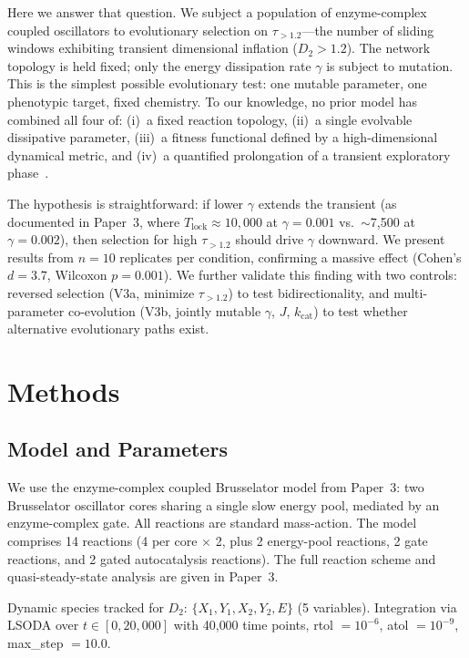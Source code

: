 \documentclass[twocolumn,showpacs,preprintnumbers,amsmath,amssymb,prd,floatfix]{revtex4-2}
\newcommand{\tauexp}{\tau_{>1.2}}
\newcommand{\Tlock}{T_{\mathrm{lock}}}
\newcommand{\Dtwo}{D_2}
\newcommand{\kcat}{k_{\mathrm{cat}}}
\begin{document}
Here we answer that question. We subject a population of enzyme-complex coupled oscillators to evolutionary selection on $\tauexp$---the number of sliding windows exhibiting transient dimensional inflation ($\Dtwo > 1.2$). The network topology is held fixed; only the energy dissipation rate $\gamma$ is subject to mutation. This is the simplest possible evolutionary test: one mutable parameter, one phenotypic target, fixed chemistry. To our knowledge, no prior model has combined all four of: (i)~a fixed reaction topology, (ii)~a single evolvable dissipative parameter, (iii)~a fitness functional defined by a high-dimensional dynamical metric, and (iv)~a quantified prolongation of a transient exploratory phase~\cite{nghe2015, vanchurin2022}.

The hypothesis is straightforward: if lower $\gamma$ extends the transient (as documented in Paper~3, where $\Tlock \approx 10{,}000$ at $\gamma = 0.001$ vs.\ $\sim$7{,}500 at $\gamma = 0.002$), then selection for high $\tauexp$ should drive $\gamma$ downward. We present results from $n = 10$ replicates per condition, confirming a massive effect (Cohen's $d = 3.7$, Wilcoxon $p = 0.001$). We further validate this finding with two controls: reversed selection (V3a, minimize $\tauexp$) to test bidirectionality, and multi-parameter co-evolution (V3b, jointly mutable $\gamma$, $J$, $\kcat$) to test whether alternative evolutionary paths exist.

\section{Methods}
\label{sec:methods}

\subsection{Model and Parameters}

We use the enzyme-complex coupled Brusselator model from Paper~3: two Brusselator oscillator cores sharing a single slow energy pool, mediated by an enzyme-complex gate. All reactions are standard mass-action. The model comprises 14 reactions (4 per core $\times$ 2, plus 2 energy-pool reactions, 2 gate reactions, and 2 gated autocatalysis reactions). The full reaction scheme and quasi-steady-state analysis are given in Paper~3.

Dynamic species tracked for $\Dtwo$: $\{X_1, Y_1, X_2, Y_2, E\}$ (5 variables). Integration via LSODA over $t \in [0, 20{,}000]$ with 40{,}000 time points, rtol $= 10^{-6}$, atol $= 10^{-9}$, max\_step $= 10.0$.
\end{document}
